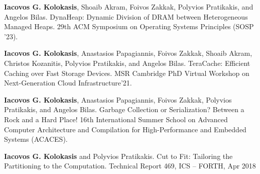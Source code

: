 \vspace{-15pt}
\begin{cventries}
  \cventry
    {}
    {}
    {}
    {}
    {\textbf{Iacovos G. Kolokasis}, Shoaib Akram, Foivos
    Zakkak, Polyvios Pratikakis, and Angelos Bilas.%
	DynaHeap: Dynamic Division of DRAM between Heterogeneous Managed Heaps.
  29th ACM Symposium on Operating Systems Principles (SOSP '23).
	}
  {}

  \cventry
    {}
    {}
    {}
    {}
    {\textbf{Iacovos G. Kolokasis}, Anastasios Papagiannis, Foivos
    Zakkak, Shoaib Akram, Christos Kozanitis, Polyvios Pratikakis, and Angelos Bilas.%
	TeraCache: Efficient Caching over Fast Storage Devices. 
	MSR Cambridge PhD Virtual Workshop on Next-Generation Cloud Infrastructure'21.
	}
  {}

  \cventry
    {}
    {}
    {}
    {}
    {\textbf{Iacovos G. Kolokasis}, Anastasios Papagiannis, Foivos
    Zakkak, Polyvios Pratikakis, and Angelos Bilas.%
	Garbage
    Collection or Serialization? Between a Rock and a Hard Place! 
    16th International Summer School on Advanced Computer Architecture
    and Compilation for High-Performance and Embedded Systems
    (ACACES).}
  {}

\end{cventries}
      

\vspace{-15pt}
\begin{cventries}

  \cventry
    {}
    {}
    {}
    {}
    {\textbf{Iacovos G. Kolokasis} and Polyvios Pratikakis.
      Cut to Fit: Tailoring the Partitioning to the Computation.
      Technical Report 469, ICS -- FORTH, Apr 2018 }{}%


\end{cventries}
